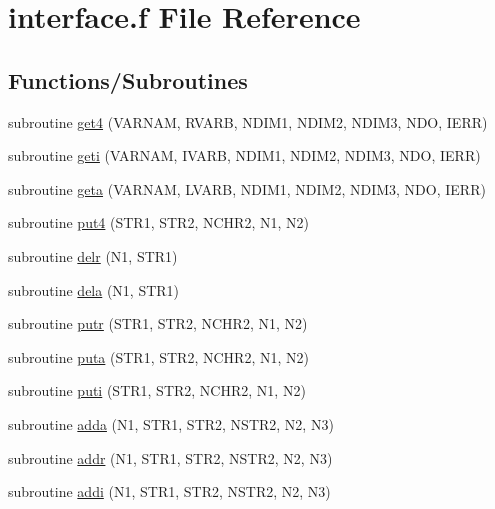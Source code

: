 \hypertarget{interface_8f}{}\section{interface.\+f File Reference}
\label{interface_8f}
\subsection*{Functions/\+Subroutines}
\begin{DoxyCompactItemize}
\item 
subroutine \hyperlink{interface_8f_ac8790f309ea371d3baf8c028d6b49e5b}{get4} (V\+A\+R\+N\+AM, R\+V\+A\+RB, N\+D\+I\+M1, N\+D\+I\+M2, N\+D\+I\+M3, N\+DO, I\+E\+RR)
\item 
subroutine \hyperlink{interface_8f_a3ae66a60ec1589dc5a59d4e0504b3b0c}{geti} (V\+A\+R\+N\+AM, I\+V\+A\+RB, N\+D\+I\+M1, N\+D\+I\+M2, N\+D\+I\+M3, N\+DO, I\+E\+RR)
\item 
subroutine \hyperlink{interface_8f_a39a634569e6241065eed8f5127700250}{geta} (V\+A\+R\+N\+AM, L\+V\+A\+RB, N\+D\+I\+M1, N\+D\+I\+M2, N\+D\+I\+M3, N\+DO, I\+E\+RR)
\item 
subroutine \hyperlink{interface_8f_ae24d34be5944d9b663113269d70f25c5}{put4} (S\+T\+R1, S\+T\+R2, N\+C\+H\+R2, N1, N2)
\item 
subroutine \hyperlink{interface_8f_ace365bef8f59e3de4efaea6303e5a50f}{delr} (N1, S\+T\+R1)
\item 
subroutine \hyperlink{interface_8f_a1fd2e83b281606407f7990c756d9072c}{dela} (N1, S\+T\+R1)
\item 
subroutine \hyperlink{interface_8f_aaec75c0e539fcc5c41612a47078fbb5c}{putr} (S\+T\+R1, S\+T\+R2, N\+C\+H\+R2, N1, N2)
\item 
subroutine \hyperlink{interface_8f_a4c20993a508f8cf61100bdcc9883ee15}{puta} (S\+T\+R1, S\+T\+R2, N\+C\+H\+R2, N1, N2)
\item 
subroutine \hyperlink{interface_8f_af642734b207cfc92a030baecf317b152}{puti} (S\+T\+R1, S\+T\+R2, N\+C\+H\+R2, N1, N2)
\item 
subroutine \hyperlink{interface_8f_a06e06b83a933855a258c22bdff0d38dc}{adda} (N1, S\+T\+R1, S\+T\+R2, N\+S\+T\+R2, N2, N3)
\item 
subroutine \hyperlink{interface_8f_a5696959340499139130b420c4ac78373}{addr} (N1, S\+T\+R1, S\+T\+R2, N\+S\+T\+R2, N2, N3)
\item 
subroutine \hyperlink{interface_8f_ae6231d12a4386a2dd80ae35f21fdde1a}{addi} (N1, S\+T\+R1, S\+T\+R2, N\+S\+T\+R2, N2, N3)
\end{DoxyCompactItemize}


